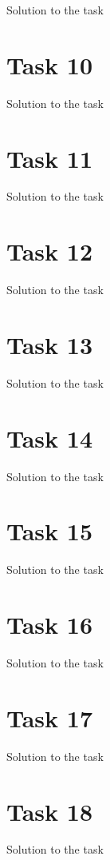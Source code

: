 \documentclass[a4paper,12pt,oneside,onecolumn]{article} %
\begin{document}
Solution to the task

\section*{Task 10}

Solution to the task

\section*{Task 11}

Solution to the task

\section*{Task 12}

Solution to the task

\section*{Task 13}

Solution to the task

\section*{Task 14}

Solution to the task

\section*{Task 15}

Solution to the task

\section*{Task 16}

Solution to the task

\section*{Task 17}

Solution to the task

\section*{Task 18}

Solution to the task
\end{document}
